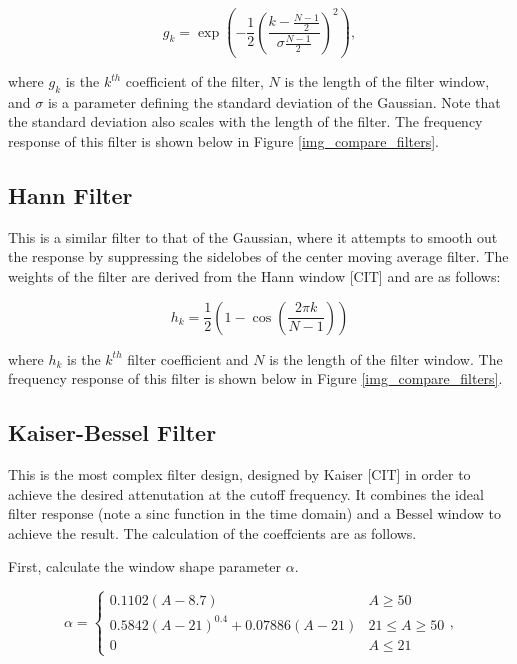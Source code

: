                 \begin{equation}
                    g_k = \exp(-\frac{1}{2}(\frac{k - \frac{N-1}{2}}{\sigma \frac{N-1}{2}})^2),
                \end{equation}

                where $g_k$ is the $k^{th}$ coefficient of the filter, $N$ is the length of the filter window, and $\sigma$ is a parameter defining the standard deviation of the Gaussian. Note that the standard deviation also scales with the length of the filter. The frequency response of this filter is shown below in Figure \ref{img_compare_filters}.

            \subsection{Hann Filter}

                This is a similar filter to that of the Gaussian, where it attempts to smooth out the response by suppressing the sidelobes of the center moving average filter. The weights of the filter are derived from the Hann window [CIT] and are as follows: 

                \begin{equation}
                    h_k = \frac{1}{2}(1 - \cos(\frac{2\pi k}{N - 1}))
                \end{equation}

                where $h_k$ is the $k^{th}$ filter coefficient and $N$ is the length of the filter window. The frequency response of this filter is shown below in Figure \ref{img_compare_filters}. 

            \subsection{Kaiser-Bessel Filter}

                This is the most complex filter design, designed by Kaiser [CIT] in order to achieve the desired attenutation at the cutoff frequency. It combines the ideal filter response (note a sinc function in the time domain) and a Bessel window to achieve the result. The calculation of the coeffcients are as follows.

                First, calculate the window shape parameter $\alpha$. 

                \begin{equation}
                    \alpha = 
                        \begin{cases}
                            0.1102(A - 8.7) & A \ge 50 \\
                            0.5842(A-21)^{0.4} + 0.07886(A-21) & 21 \leq A \geq 50 \\
                            0 & A \le 21
                        \end{cases},
                \end{equation}

